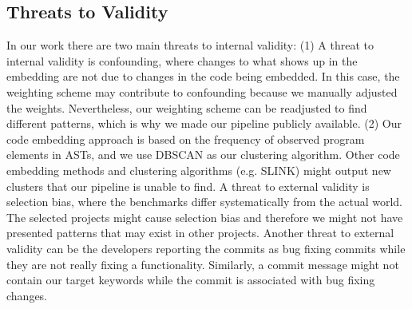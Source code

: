\subsection{Threats to Validity}

In our work there are two main threats to internal validity: (1) A threat to internal validity is confounding, where changes to what shows up in the embedding are not due to changes in the code being embedded. In this case, the weighting scheme may contribute to confounding because we manually adjusted the weights. Nevertheless, our weighting scheme can be readjusted to find different patterns, which is why we made our pipeline publicly available. (2) Our code embedding approach is based on the frequency of observed program elements in ASTs, and we use DBSCAN as our clustering algorithm. Other code embedding methods and clustering algorithms (e.g. SLINK) might output new clusters that our pipeline is unable to find. A threat to external validity is selection bias, where the benchmarks differ systematically from the actual world. The selected projects might cause selection bias and therefore we might not have presented patterns that may exist in other projects. Another threat to external validity can be the developers reporting the commits as bug fixing commits while they are not really fixing a functionality. Similarly, a commit message might not contain our target keywords while the commit is associated with bug fixing changes.
